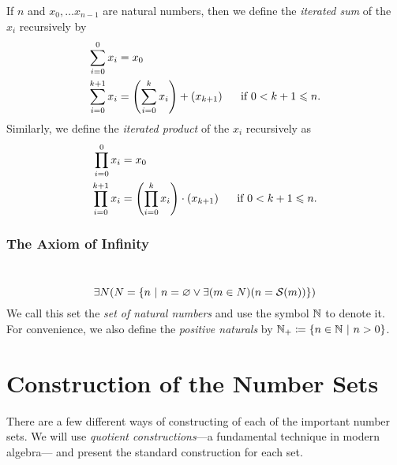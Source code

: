 \begin{definition}
    If $n$ and $x_0, \dots x_{n - 1}$ are natural numbers,
    then we define the \emph{iterated sum} of the $x_i$ recursively by
    \begin{align*}
        \sum_{i = 0}^{0}x_i &= x_0\\
        \sum_{i = 0}^{k + 1}x_i &= \pn*{\sum_{i = 0}^{k}x_i} + \pn*{x_{k + 1}}~~~~\text{ if } 0 < k + 1 \leq n.
    \end{align*}
    Similarly, we define the \emph{iterated product} of the $x_i$ recursively as
    \begin{align*}
        \prod_{i = 0}^{0}x_i &= x_0\\
        \prod_{i = 0}^{k + 1}x_i &= \pn*{\prod_{i = 0}^{k}x_i} \cdot \pn*{x_{k + 1}}~~~~\text{ if } 0 < k + 1 \leq n.
    \end{align*}
\end{definition}

\subsection{The Axiom of Infinity}
\begin{axiom}[Infinity]
    ~\vspace{-\baselineskip}
    \[
        \exists N \pn*{N = \set*{n \suchthat n = \emptyset \join \exists\pn*{m \in N}\pn*{n = \successor{m}}}}
    \]
    We call this set the \emph{set of natural numbers} and use the symbol $\mathbb{N}$ to denote it.
    For convenience,
    we also define the \emph{positive naturals} by $\N_+ \defn \set*{n \in \N \suchthat n > 0}$.
\end{axiom}

\appendix
\chapter{Construction of the Number Sets}
There are a few different ways of constructing of each of the important number sets.
We will use \emph{quotient constructions}---a fundamental technique in modern algebra---%
and present the standard construction for each set.

